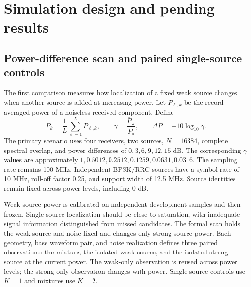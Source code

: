 \section{Simulation design and pending results}\label{sec:ug-experiments}
\subsection{Power-difference scan and paired single-source controls}\label{sec:ug-protocol}
The first comparison measures how localization of a fixed weak source changes when another source is added at increasing power. Let $P_{\ell,k}$ be the record-averaged power of a noiseless received component. Define
\begin{equation}\label{eq:ug-gamma}
\overline P_k=\frac1L\sum_{\ell=1}^LP_{\ell,k},\qquad
\gamma=\frac{\overline P_{\mathrm w}}{\overline P_{\mathrm s}},\qquad
\Delta P=-10\log_{10}\gamma.
\end{equation}
The primary scenario uses four receivers, two sources, $N=16384$, complete spectral overlap, and power differences of $0,3,6,9,12,15$ dB. The corresponding $\gamma$ values are approximately $1,0.5012,0.2512,0.1259,0.0631,0.0316$. The sampling rate remains 100 MHz. Independent BPSK/RRC sources have a symbol rate of 10 MHz, roll-off factor 0.25, and support width of 12.5 MHz. Source identities remain fixed across power levels, including 0 dB.

Weak-source power is calibrated on independent development samples and then frozen. Single-source localization should be close to saturation, with inadequate signal information distinguished from missed candidates. The formal scan holds the weak source and noise fixed and changes only strong-source power. Each geometry, base waveform pair, and noise realization defines three paired observations: the mixture, the isolated weak source, and the isolated strong source at the current power. The weak-only observation is reused across power levels; the strong-only observation changes with power. Single-source controls use $K=1$ and mixtures use $K=2$.

